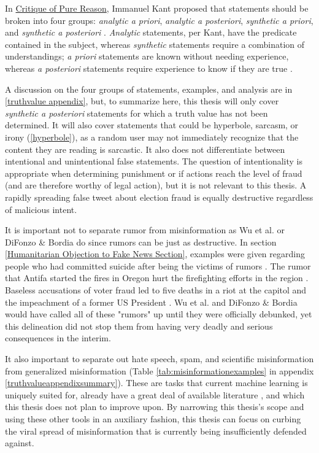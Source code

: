 \documentclass[preprint,review,12pt]{elsarticle}
\begin{document}
In \underline{Critique of Pure Reason}, Immanuel Kant proposed that statements should be broken into four groups: \textit{analytic a priori}, \textit{analytic a posteriori}, \textit{synthetic a priori}, and \textit{synthetic a posteriori} \cite{kant1908critique,frege1988collected,quine1951main}. \textit{Analytic} statements, per Kant, have the predicate contained in the subject, whereas \textit{synthetic} statements require a combination of understandings; \textit{a priori} statements are known without needing experience, whereas \textit{a posteriori} statements require experience to know if they are true \cite{wright1997companion}. 

A discussion on the four groups of statements, examples, and analysis are in \ref{truthvalue appendix}, but, to summarize here, this thesis will only cover \textit{synthetic a posteriori} statements for which a truth value has not been determined. It will also cover statements that could be hyperbole, sarcasm, or irony (\ref{hyperbole}), as a random user may not immediately recognize that the content they are reading is sarcastic. It also does not differentiate between intentional and unintentional false statements. The question of intentionality is appropriate when determining punishment or if actions reach the level of fraud (and are therefore worthy of legal action), but it is not relevant to this thesis. A rapidly spreading false tweet about election fraud is equally destructive regardless of malicious intent.

It is important not to separate rumor from misinformation as Wu et al. or DiFonzo \& Bordia do since rumors can be just as destructive. In section \ref{Humanitarian Objection to Fake News Section}, examples were given regarding people who had committed suicide after being the victims of rumors \cite{starbird2014rumors,williamson2019alex}. The rumor that Antifa started the fires in Oregon hurt the firefighting efforts in the region  \cite{robinson2020oregon}. Baseless accusations of voter fraud led to five deaths in a riot at the capitol and the impeachment of a former US President \cite{fandos2021trump,Levenson2021capitol}.  Wu et al. and DiFonzo \& Bordia would have called all of these "rumors" up until they were officially debunked, yet this delineation did not stop them from having very deadly and serious consequences in the interim.

It also important to separate out hate speech, spam, and scientific misinformation from generalized misinformation (Table \ref{tab:misinformationexamples} in appendix \ref{truthvalueappendixsummary}). These are tasks that current machine learning is uniquely suited for, already have a great deal of available literature \cite{xu2019exploiting,wang2010detecting,ahmed2018detecting,al2019spam,oriola2020evaluating,gaydhani2018detecting,al2020lies,farrell2019evidence}, and which this thesis does not plan to improve upon. By narrowing this thesis's scope and using these other tools in an auxiliary fashion, this thesis can focus on curbing the viral spread of misinformation that is currently being insufficiently defended against. 
\end{document}
